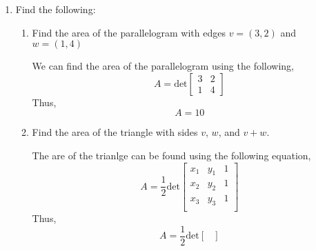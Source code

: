 \begin{enumerate}
    \item Find the following:
        \begin{enumerate}[label=\alph*.]
            \item Find the area of the parallelogram with edges $v=(3,2)$
                and $w=(1,4)$
                \begin{mdframed}[style=MyFrame]
                    We can find the area of the parallelogram using the
                    following,
                    \begin{equation}
                        A = 
                        \text{det}
                        \begin{bmatrix}
                            3   &   2   \\
                            1   &   4
                        \end{bmatrix}
                    \end{equation}
                    Thus,
                    \begin{equation}
                        A = 10
                    \end{equation}
                \end{mdframed}
            \item Find the area of the triangle with sides $v$, $w$, and
                $v+w$. 
                    \begin{mdframed}[style=MyFrame]
                        The are of the trianlge can be found using the
                        following equation,
                        \begin{equation}
                            A = \frac{1}{2} 
                            \text{det}
                            \begin {bmatrix}
                            x_{1}       & y_{1}     &   1   \\
                            x_{2}       & y_{2}     &   1   \\
                            x_{3}       & y_{3}     &   1   \\
                            \end{bmatrix}
                        \end{equation}
                        Thus,
                        \begin{equation}
                            A = \frac{1}{2} 
                            \text{det}
                            \begin {bmatrix}

\end{bmatrix}
\end{equation}
\end{mdframed}
\end{enumerate}
\end{enumerate}
